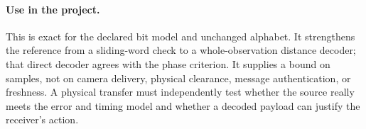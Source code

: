 \documentclass{article}
\begin{document}
\paragraph{Use in the project.}
This is exact for the declared bit model and unchanged alphabet.
It strengthens the reference from a sliding-word check to
a whole-observation distance decoder; that direct decoder
agrees with the phase criterion. It supplies a bound on
samples, not on camera delivery, physical clearance,
message authentication, or freshness. A physical transfer
must independently test whether the source really meets the
error and timing model and whether a decoded payload can
justify the receiver's action.
\end{document}
